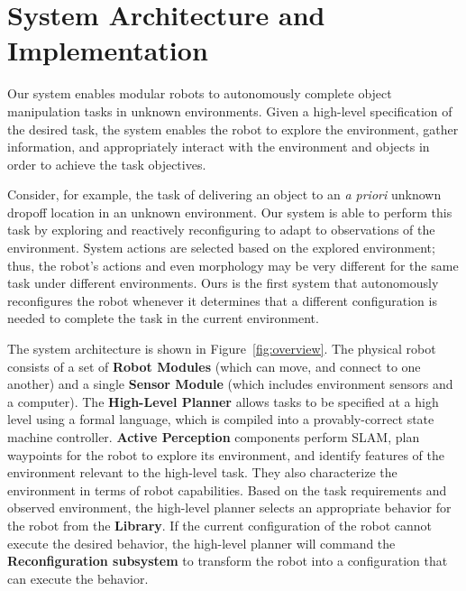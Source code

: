\documentclass[conference]{IEEEtran}
\begin{document}

\section{System Architecture and Implementation}\label{sec:system}
%
Our system enables modular robots to autonomously complete object manipulation tasks in unknown environments.   Given a high-level specification of the desired task, the system enables the robot to explore the environment, gather information, and appropriately interact with the environment and objects in order to achieve the task objectives.

Consider, for example, the task of delivering an object to an \textit{a priori} unknown dropoff location in an unknown environment. Our system is able to perform this task by exploring and reactively reconfiguring to adapt to observations of the environment. System actions are selected based on the explored environment; thus, the robot's actions and even morphology may be very different for the same task under different environments. Ours is the first system that autonomously reconfigures the robot whenever it determines that a different configuration is needed to complete the task in the current environment.

The system architecture is shown in Figure~\ref{fig:overview}.
The physical robot consists of a set of \textbf{Robot Modules} (which can move, and connect to one another) and a single \textbf{Sensor Module} (which includes environment sensors and a computer).
The \textbf{High-Level Planner} allows tasks to be specified at a high level using a formal language, which is compiled into a provably-correct state machine controller.
\textbf{Active Perception} components perform SLAM, plan waypoints for the robot to explore its environment, and identify features of the environment relevant to the high-level task. They also characterize the environment in terms of robot capabilities.
Based on the task requirements and observed environment, the high-level planner selects an appropriate behavior for the robot from the \textbf{Library}.
If the current configuration of the robot cannot execute the desired behavior, the high-level planner will command the \textbf{Reconfiguration subsystem} to transform the robot into a configuration that can execute the behavior.
\end{document}
